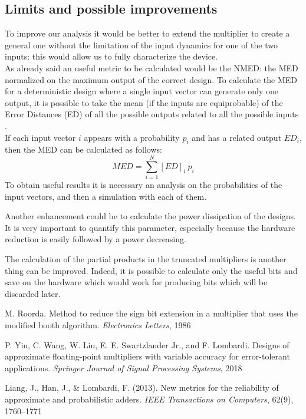 \documentclass[a4paper]{article}
\begin{document}
	\subsection{Limits and possible improvements}
	To improve our analysis it would be better to extend the multiplier to create a general one without the limitation of the input dynamics for one of the two inputs: this would allow us to fully characterize the device.\\
	As already said an useful metric to be calculated would be the NMED: the MED normalized on the maximum output of the correct design. To calculate the MED for a deterministic design where a single input vector can generate only one output, it is possible to take the mean (if the inputs are equiprobable) of the Error Distances (ED) of all the possible outputs related to all the possible inputs \cite{liang}.\\
	If each input vector $i$ appears with a probability $p_i$ and has a related output $ED_i$, then the MED can be calculated as follows: 
	\begin{equation}
		MED = \displaystyle\sum_{i=1}^{N} [ED]_i\ p_i
	\end{equation}
	To obtain useful results it is necessary an analysis on the probabilities of the input vectors, and then a simulation with each of them.

	Another enhancement could be to calculate the power dissipation of the designs. It is very important to quantify this parameter, especially because the hardware reduction is easily followed by a power decreasing.

	The calculation of the partial products in the truncated multipliers is another thing can be improved. Indeed, it is possible to calculate only the useful bits and save on the hardware which would work for producing bits which will be discarded later.
	
	

	\begin{thebibliography}{3}
	M. Roorda. Method to reduce the sign bit extension in a multiplier that uses the modified
	booth algorithm. \textit{Electronics Letters}, 1986

	P. Yin, C. Wang, W. Liu, E. E. Swartzlander Jr., and F. Lombardi. Designs of approximate
	floating-point multipliers with variable accuracy for error-tolerant applications. \textit{Springer
	Journal of Signal Processing Systems}, 2018

	Liang, J., Han, J., \& Lombardi, F. (2013). New metrics for the
	reliability of approximate and probabilistic adders. \textit{IEEE 
	Transactions on Computers}, 62(9), 1760–1771
	\end{thebibliography}
\end{document}
